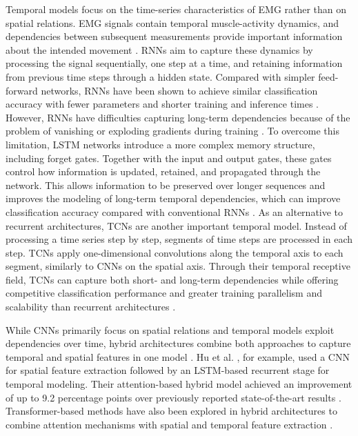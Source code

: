 Temporal models focus on the time-series characteristics of EMG rather than on spatial relations. EMG signals contain temporal muscle-activity dynamics, and dependencies between subsequent measurements provide important information about the intended movement \cite{zhong_deep_2026, li_gesture_2021}.
\acp{RNN} aim to capture these dynamics by processing the signal sequentially, one step at a time, and retaining information from previous time steps through a hidden state. Compared with simpler feed-forward networks, \acp{RNN} have been shown to achieve similar classification accuracy with fewer parameters and shorter training and inference times \cite{li_gesture_2021}. However, \acp{RNN} have difficulties capturing long-term dependencies because of the problem of vanishing or exploding gradients during training \cite{zhong_deep_2026}.
To overcome this limitation, \ac{LSTM} networks introduce a more complex memory structure, including forget gates. Together with the input and output gates, these gates control how information is updated, retained, and propagated through the network. This allows information to be preserved over longer sequences and improves the modeling of long-term temporal dependencies, which can improve classification accuracy compared with conventional \acp{RNN} \cite{zhong_deep_2026}.
As an alternative to recurrent architectures, \acp{TCN} are another important temporal model. Instead of processing a time series step by step, segments of time steps are processed in each step. \acp{TCN} apply one-dimensional convolutions along the temporal axis to each segment, similarly to \acp{CNN} on the spatial axis. Through their temporal receptive field, \acp{TCN} can capture both short- and long-term dependencies while offering competitive classification performance and greater training parallelism and scalability than recurrent architectures \cite{zhong_deep_2026}.

While \acp{CNN} primarily focus on spatial relations and temporal models exploit dependencies over time, hybrid architectures combine both approaches to capture temporal and spatial features in one model \cite{li_gesture_2021}. Hu et al. \cite{hu_novel_2018}, for example, used a \ac{CNN} for spatial feature extraction followed by an LSTM-based recurrent stage for temporal modeling. Their attention-based hybrid model achieved an improvement of up to 9.2 percentage points over previously reported state-of-the-art results \cite{hu_novel_2018}. Transformer-based methods have also been explored in hybrid architectures to combine attention mechanisms with spatial and temporal feature extraction \cite{zhong_deep_2026}.


